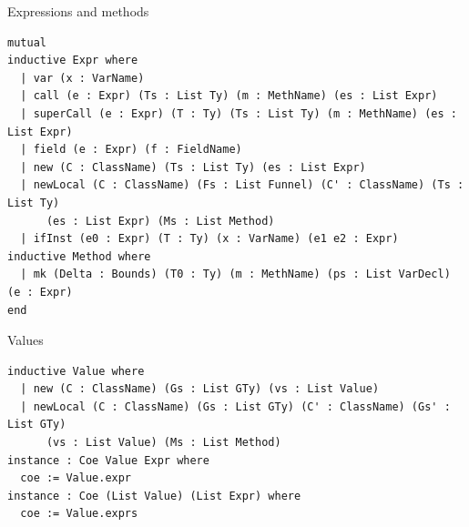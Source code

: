 \begin{cmp}{Expressions and methods}
\begin{paperside}
\end{paperside}
\begin{leanside}
\begin{lstlisting}[style=leanside]
mutual
inductive Expr where
  | var (x : VarName)
  | call (e : Expr) (Ts : List Ty) (m : MethName) (es : List Expr)
  | superCall (e : Expr) (T : Ty) (Ts : List Ty) (m : MethName) (es : List Expr)
  | field (e : Expr) (f : FieldName)
  | new (C : ClassName) (Ts : List Ty) (es : List Expr)
  | newLocal (C : ClassName) (Fs : List Funnel) (C' : ClassName) (Ts : List Ty)
      (es : List Expr) (Ms : List Method)
  | ifInst (e0 : Expr) (T : Ty) (x : VarName) (e1 e2 : Expr)
inductive Method where
  | mk (Delta : Bounds) (T0 : Ty) (m : MethName) (ps : List VarDecl) (e : Expr)
end
\end{lstlisting}
\end{leanside}
\end{cmp}

\begin{cmp}{Values}
\begin{paperside}
\end{paperside}
\begin{leanside}
\begin{lstlisting}[style=leanside]
inductive Value where
  | new (C : ClassName) (Gs : List GTy) (vs : List Value)
  | newLocal (C : ClassName) (Gs : List GTy) (C' : ClassName) (Gs' : List GTy)
      (vs : List Value) (Ms : List Method)
instance : Coe Value Expr where
  coe := Value.expr
instance : Coe (List Value) (List Expr) where
  coe := Value.exprs
\end{lstlisting}
\end{leanside}
\end{cmp}


